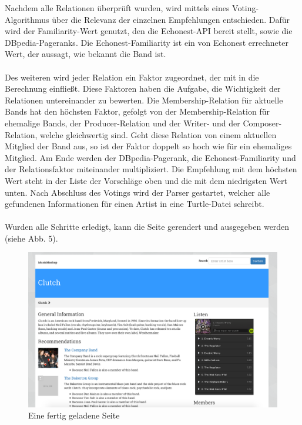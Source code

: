 Nachdem alle Relationen überprüft wurden, wird mittels eines Voting-Algorithmus über die Relevanz der einzelnen Empfehlungen entschieden. Dafür wird der Familiarity-Wert genutzt, den die Echonest-API bereit stellt, sowie die DBpedia-Pageranks. Die Echonest-Familiarity ist ein von Echonest errechneter Wert, der aussagt, wie bekannt die Band ist.\cite{echonest_familiarity}

\paragraph{} Des weiteren wird jeder Relation ein Faktor zugeordnet, der mit in die Berechnung einfließt. Diese Faktoren haben die Aufgabe, die Wichtigkeit der Relationen untereinander zu bewerten. Die Membership-Relation für aktuelle Bands hat den höchsten Faktor, gefolgt von der Membership-Relation für ehemalige Bands, der Producer-Relation und der Writer- und der Composer-Relation, welche gleichwertig sind. Geht diese Relation von einem aktuellen Mitglied der Band aus, so ist der Faktor doppelt so hoch wie für ein ehemaliges Mitglied. Am Ende werden der DBpedia-Pagerank, die Echonest-Familiarity und der Relationsfaktor miteinander multipliziert. Die Empfehlung mit dem höchsten Wert steht in der Liste der Vorschläge oben und die mit dem niedrigsten Wert unten.
Nach Abschluss des Votings wird der Parser gestartet, welcher alle gefundenen Informationen für einen Artist in eine Turtle-Datei schreibt. %

\paragraph{} Wurden alle Schritte erledigt, kann die Seite gerendert und ausgegeben werden (siehe Abb. 5).

\begin{figure}[ht!]
	\centering
	\includegraphics[width=137mm]{bilder/final.png}
	\caption{Eine fertig geladene Seite \label{overflow}}
\end{figure}